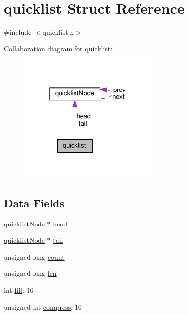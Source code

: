 \hypertarget{structquicklist}{}\section{quicklist Struct Reference}
\label{structquicklist}


{\ttfamily \#include $<$quicklist.\+h$>$}



Collaboration diagram for quicklist\+:
\nopagebreak
\begin{figure}[H]
\begin{center}
\leavevmode
\includegraphics[width=196pt]{structquicklist__coll__graph}
\end{center}
\end{figure}
\subsection*{Data Fields}
\begin{DoxyCompactItemize}
\item 
\hyperlink{structquicklist_node}{quicklist\+Node} $\ast$ \hyperlink{structquicklist_a9768476640799c4dc25850d7dfb5f436}{head}
\item 
\hyperlink{structquicklist_node}{quicklist\+Node} $\ast$ \hyperlink{structquicklist_a415ce772af9efb537aa65ec5766ed45a}{tail}
\item 
unsigned long \hyperlink{structquicklist_a61b4b8d2ac3f4853727e2c2fcbec3503}{count}
\item 
unsigned long \hyperlink{structquicklist_af2e72f8a5bf4bcdb77566c2936d5f13d}{len}
\item 
int \hyperlink{structquicklist_a1bddf1e646fa3d6b3553e28e41cfe7c5}{fill}\+: 16
\item 
unsigned int \hyperlink{structquicklist_a851a2a518700a4f5aa3d8e099978afca}{compress}\+: 16
\end{DoxyCompactItemize}


